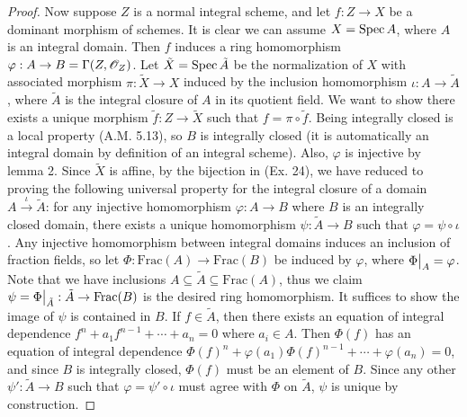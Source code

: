 \documentclass{article}
\begin{document}
\begin{enumerate} [label=\textbf{\arabic*.}, leftmargin=0em]
\begin{proof}
    Now suppose $Z$ is a normal integral scheme, and let $f : Z \to X$ be a dominant morphism of schemes. It is clear we can assume $X = \operatorname{Spec}{A}$, where $A$ is an integral domain. Then $f$ induces a ring homomorphism $\varphi : A \to B = \Gamma(Z, \mathscr{O}_Z)$. Let $\tilde{X} = \operatorname{Spec}{\tilde{A}}$ be the normalization of $X$ with associated morphism $\pi : \tilde{X} \to X$ induced by the inclusion homomorphism $\iota : A \to \tilde{A}$, where $\tilde{A}$ is the integral closure of $A$ in its quotient field. We want to show there exists a unique morphism $\tilde{f} : Z \to \tilde{X}$ such that $f = \pi \circ \tilde{f}$. Being integrally closed is a local property (A.M. 5.13), so $B$ is integrally closed (it is automatically an integral domain by definition of an integral scheme). Also, $\varphi$ is injective by lemma 2. Since $\tilde{X}$ is affine, by the bijection in (Ex. 24), we have reduced to proving the following universal property for the integral closure of a domain $A \xrightarrow{\iota} \tilde{A}$: for any injective homomorphism $\varphi : A \to B$ where $B$ is an integrally closed domain, there exists a unique homomorphism $\psi : \tilde{A} \to B$ such that $\varphi = \psi \circ \iota$. Any injective homomorphism between integral domains induces an inclusion of fraction fields, so let $\Phi : \text{Frac}(A) \to \text{Frac}(B)$ be induced by $\varphi$, where $\restr{\Phi}{A} = \varphi$. Note that we have inclusions $A \subseteq \tilde{A} \subseteq \text{Frac}(A)$, thus we claim $\psi = \restr{\Phi}{\tilde{A}} : \tilde{A} \to \text{Frac}(B)$ is the desired ring homomorphism. It suffices to show the image of $\psi$ is contained in $B$. If $f \in \tilde{A}$, then there exists an equation of integral dependence $f^n + a_1 f^{n - 1} + \cdots + a_n = 0$ where $a_i \in A$. Then $\Phi(f)$ has an equation of integral dependence $\Phi(f)^n + \varphi(a_1) \Phi(f)^{n - 1} + \cdots + \varphi(a_n) = 0$, and since $B$ is integrally closed, $\Phi(f)$ must be an element of $B$. Since any other $\psi' : \tilde{A} \to B$ such that $\varphi = \psi' \circ \iota$ must agree with $\Phi$ on $\tilde{A}$, $\psi$ is unique by construction.
\end{proof}


\end{enumerate}
\end{document}
